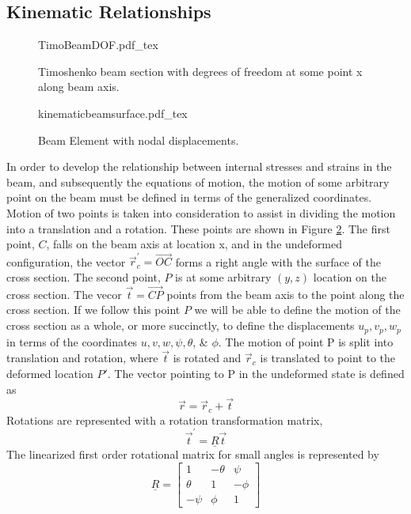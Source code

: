 \subsection{Kinematic Relationships} \label{Kinematic Relationships}
\begin{figure}
	\centering
	\def\svgwidth{250pt}
	{TimoBeamDOF.pdf_tex}
	\caption{Timoshenko beam section with degrees of freedom at some point x along beam axis.}
	\label{fig:TimoBeamDOF}
\end{figure}
\begin{figure}
\centering
\def\svgwidth{400pt}
{kinematicbeamsurface.pdf_tex}
\caption{Beam Element with nodal displacements.}
\label{fig:KineBeamElem}
\end{figure}
In order to develop the relationship between internal stresses and strains in the beam, and subsequently the equations of motion, the motion of some arbitrary point on the beam must be defined in terms of the generalized coordinates. Motion of two points is taken into consideration to assist in dividing the motion into a translation and a rotation. These points are shown in Figure \ref{fig:KineBeamElem}. The first point, $ C $, falls on the beam axis at location x, and in the undeformed configuration, the vector $ \vec{r}_c^\prime= \overrightarrow{OC} $ forms a right angle with the surface of the cross section. The second point, $ P $ is at some arbitrary $ (y,z) $ location on the cross section. The vecor $ \vec{t}=\overrightarrow{CP} $ points from the beam axis to the point along the cross section. If we follow this point $ P $ we will be able to define the motion of the cross section as a whole, or more succinctly, to define the displacements $ u_p,v_p,w_p $ in terms of the coordinates $ u,v,w,\psi,\theta$, \& $\phi $. The motion of point P is split into translation and rotation, where $ \vec{t} $ is rotated and $ \vec{r}_c $ is translated to point to the deformed location $ P' $. The vector pointing to P in the undeformed state is defined as
\begin{equation}\label{eq:r}
\vec{r}=\vec{r}_c+\vec{t}
\end{equation}
Rotations are represented with a rotation transformation matrix,
\begin{equation}\label{eq:trot}
\vec{t}^\prime=\underline{R}\vec{t}
\end{equation}
The linearized first order rotational matrix for small angles is represented by 
\begin{equation}\label{eq:RotTransformation}
\underline{R}=\left[\begin{array}{ccc}
1&-\theta&\psi\\
\theta&1&-\phi\\
-\psi&\phi&1
\end{array}\right]
\end{equation}
